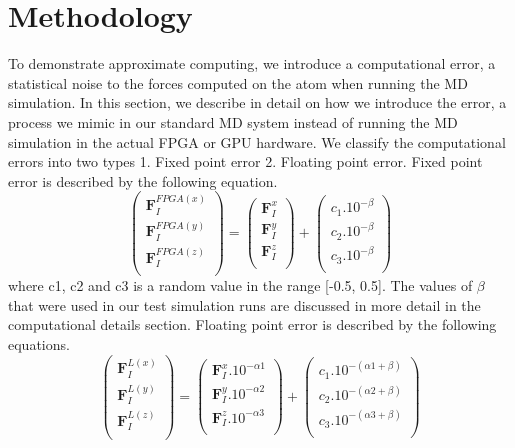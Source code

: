 \documentclass[aps,pre,twocolumn,showpacs,preprintnumbers,amsmath,amssymb]{revtex4-1}
\begin{document}
\section{Methodology}
To demonstrate approximate computing, we introduce a computational error, a statistical noise to the forces computed on the atom when running the MD simulation. In this section, we describe in detail on how we introduce the error, a process we mimic in our standard MD system instead of running the MD simulation in the actual FPGA or GPU hardware. We classify the computational errors into two types 1. Fixed point error 2. Floating point error. 
Fixed point error is described by the following equation. 
\begin{equation}
\begin{pmatrix}
\textbf{F}_{I}^{FPGA(x)}\\ 
\textbf{F}_{I}^{FPGA(y)}\\ 
\textbf{F}_{I}^{FPGA(z)}\\ 

\end{pmatrix} = 
\begin{pmatrix}
\textbf{F}_{I}^{x}\\ 
\textbf{F}_{I}^{y}\\ 
\textbf{F}_{I}^{z}\\ 

\end{pmatrix} + 
\begin{pmatrix}
c_{1}.10^{-\beta }\\ 
c_{2}.10^{-\beta }\\ 
c_{3}.10^{-\beta }\\ 

\end{pmatrix}
\end{equation}
where c1, c2 and c3 is a random value in the range [-0.5, 0.5]. The values of \(\beta\) that were used in our test simulation runs are discussed in more detail in the computational details section.  
Floating point error is described by the following equations.
\begin{equation}
\begin{pmatrix}
\textbf{F}_{I}^{L(x)}\\ 
\textbf{F}_{I}^{L(y)}\\ 
\textbf{F}_{I}^{L(z)}\\ 

\end{pmatrix} = 
\begin{pmatrix}
\textbf{F}_{I}^{x}.10^{-\alpha1}\\ 
\textbf{F}_{I}^{y}.10^{-\alpha2}\\ 
\textbf{F}_{I}^{z}.10^{-\alpha3}\\ 

\end{pmatrix} + 
\begin{pmatrix}
c_{1}.10^{-(\alpha1+\beta)}\\ 
c_{2}.10^{-(\alpha2+\beta)}\\ 
c_{3}.10^{-(\alpha3+\beta)}\\ 

\end{pmatrix}
\end{equation}
\end{document}
